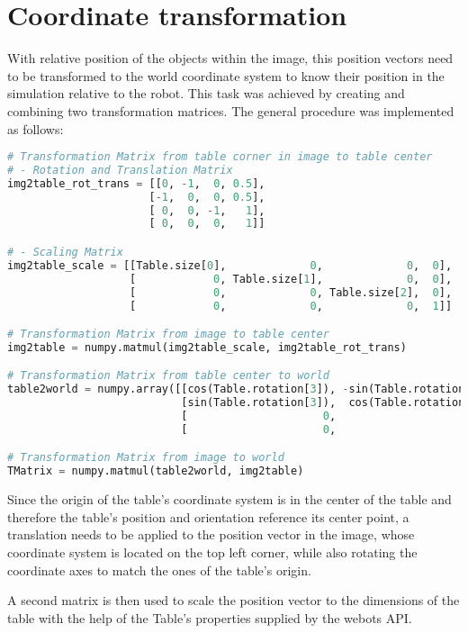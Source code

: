 \section{Coordinate transformation}

With relative position of the objects within the image, this position vectors need to be transformed to the world coordinate system to know their position in the simulation relative to the robot. 
This task was achieved by creating and combining two transformation matrices. The general procedure was implemented as follows:


\begin{lstlisting}[language=python]
# Transformation Matrix from table corner in image to table center
# - Rotation and Translation Matrix
img2table_rot_trans = [[0, -1,  0, 0.5],
                      [-1,  0,  0, 0.5],
                      [ 0,  0, -1,   1],
                      [ 0,  0,  0,   1]]

# - Scaling Matrix
img2table_scale = [[Table.size[0],             0,             0,  0],
                   [            0, Table.size[1],             0,  0],
                   [            0,             0, Table.size[2],  0],
                   [            0,             0,             0,  1]]

# Transformation Matrix from image to table center
img2table = numpy.matmul(img2table_scale, img2table_rot_trans)

# Transformation Matrix from table center to world
table2world = numpy.array([[cos(Table.rotation[3]), -sin(Table.rotation[3]),  0,  Table.position[0]],
                           [sin(Table.rotation[3]),  cos(Table.rotation[3]),  0,  Table.position[1]],
                           [                     0,                       0,  1,  Table.position[2]],
                           [                     0,                       0,  0,                 1]])

# Transformation Matrix from image to world
TMatrix = numpy.matmul(table2world, img2table)
\end{lstlisting}

Since the origin of the table's coordinate system is in the center of the table and therefore the table's position and orientation reference its center point, a translation needs to be applied to the position vector in the image, whose coordinate system is located on the top left corner, while also rotating the coordinate axes to match the ones of the table's origin.

A second matrix is then used to scale the position vector to the dimensions of the table with the help of the Table's properties supplied by the webots API.

